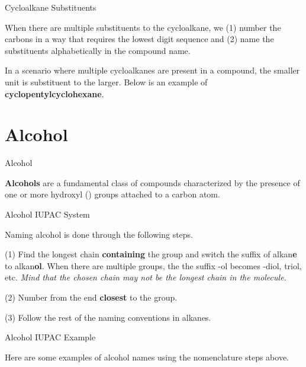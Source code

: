 \documentclass[10pt]{article}
\begin{document}
    \begin{core}{Cycloalkane Substituents}

      When there are multiple substituents to the cycloalkane, we (1) number the carbons in a way that requires the lowest digit sequence and (2) name the substituents alphabetically in the compound name.


      In a scenario where multiple cycloalkanes are present in a compound, the smaller unit is substituent to the larger. Below is an example of \textbf{cyclopentylcyclohexane}.


    \end{core}

\section{Alcohol}

  \begin{core}{Alcohol}

    \textbf{Alcohols} are a fundamental class of compounds characterized by the presence of one or more hydroxyl () groups attached to a carbon atom.

  \end{core}

  \begin{core}{Alcohol IUPAC System}

    Naming alcohol is done through the following steps.

    (1) Find the longest chain \textbf{containing} the  group and switch the suffix of alkan\textbf{e} to alkan\textbf{ol}. When there are multiple  groups, the the suffix -ol becomes -diol, triol, etc. \textit{Mind that the chosen chain may not be the longest chain in the molecule.}

    (2) Number from the end \textbf{closest} to the  group.

    (3) Follow the rest of the naming conventions in alkanes.

  \end{core}

  \begin{core}{Alcohol IUPAC Example}

    Here are some examples of alcohol names using the nomenclature steps above.


  \end{core}
\end{document}
